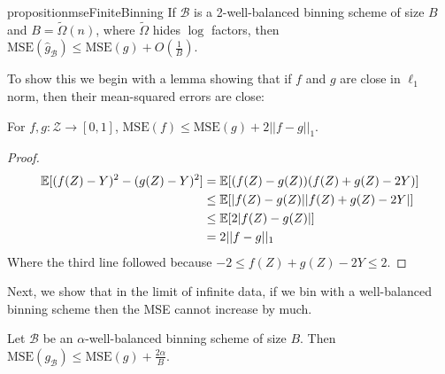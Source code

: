\begin{restatable}{proposition}{mseFiniteBinning}
\label{prop:mse-finite-binning}
If $\mathcal{B}$ is a 2-well-balanced binning scheme of size $B$ and $B = \widetilde{\Omega}(n)$, where $\widetilde{\Omega}$ hides $\log$ factors, then $\mbox{MSE}(\hat{g}_{\mathcal{B}}) \leq \mbox{MSE}(g) + O(\frac{1}{B})$.
\end{restatable}

To show this we begin with a lemma showing that if $f$ and $g$ are close in $\ell_1$ norm, then their mean-squared errors are close:

\begin{lemma}
\label{lem:mse-l1}
For $f, g : \mathcal{Z} \to [0, 1]$, $\mbox{MSE}(f) \leq \mbox{MSE}(g) + 2||f - g||_1$.
\end{lemma}

\begin{proof}
\begin{align*}
\mathbb{E}[(f(Z) - Y)^2 - (g(Z) - Y)^2] &= \mathbb{E}[(f(Z) - g(Z))(f(Z) + g(Z) - 2Y)] \\
&\leq \mathbb{E}[|f(Z) - g(Z)||f(Z) + g(Z) - 2Y|] \\
&\leq \mathbb{E}[2|f(Z) - g(Z)|] \\
& =2||f-g||_1
\end{align*}
Where the third line followed because $-2 \leq f(Z) + g(Z) - 2Y \leq 2$.
\end{proof}

Next, we show that in the limit of infinite data, if we bin with a well-balanced binning scheme then the MSE cannot increase by much.

\begin{lemma}
\label{thm:bin-sharpness}
Let $\mathcal{B}$ be an $\alpha$-well-balanced binning scheme of size $B$. Then $\mbox{MSE}(g_{\mathcal{B}}) \leq \mbox{MSE}(g) + \frac{2\alpha}{B}$.
\end{lemma}

